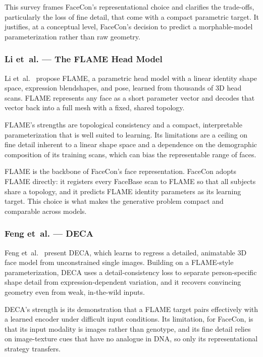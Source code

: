 This survey frames FaceCon's representational choice and clarifies the trade-offs, particularly the loss of fine detail, that come with a compact parametric target. It justifies, at a conceptual level, FaceCon's decision to predict a morphable-model parameterization rather than raw geometry.

\subsubsection{Li et~al. --- The FLAME Head Model}
Li et~al.~\cite{ref:flame} propose FLAME, a parametric head model with a linear identity shape space, expression blendshapes, and pose, learned from thousands of 3D head scans. FLAME represents any face as a short parameter vector and decodes that vector back into a full mesh with a fixed, shared topology.

FLAME's strengths are topological consistency and a compact, interpretable parameterization that is well suited to learning. Its limitations are a ceiling on fine detail inherent to a linear shape space and a dependence on the demographic composition of its training scans, which can bias the representable range of faces.

FLAME is the backbone of FaceCon's face representation. FaceCon adopts FLAME directly: it registers every FaceBase scan to FLAME so that all subjects share a topology, and it predicts FLAME identity parameters as its learning target. This choice is what makes the generative problem compact and comparable across models.

\subsubsection{Feng et~al. --- DECA}
Feng et~al.~\cite{ref:deca} present DECA, which learns to regress a detailed, animatable 3D face model from unconstrained single images. Building on a FLAME-style parameterization, DECA uses a detail-consistency loss to separate person-specific shape detail from expression-dependent variation, and it recovers convincing geometry even from weak, in-the-wild inputs.

DECA's strength is its demonstration that a FLAME target pairs effectively with a learned encoder under difficult input conditions. Its limitation, for FaceCon, is that its input modality is images rather than genotype, and its fine detail relies on image-texture cues that have no analogue in DNA, so only its representational strategy transfers.

